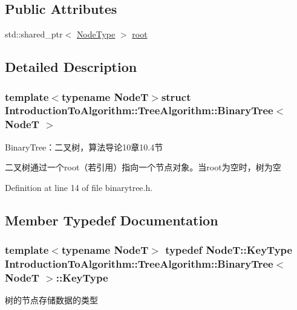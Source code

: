 \subsection*{Public Attributes}
\begin{DoxyCompactItemize}
\item 
std\+::shared\+\_\+ptr$<$ \hyperlink{struct_introduction_to_algorithm_1_1_tree_algorithm_1_1_binary_tree_a9a441f3f41c5b69758204ba60fe02010}{Node\+Type} $>$ \hyperlink{struct_introduction_to_algorithm_1_1_tree_algorithm_1_1_binary_tree_aa0d43af70ef50ff59740dced2e832074}{root}
\end{DoxyCompactItemize}


\subsection{Detailed Description}
\subsubsection*{template$<$typename Node\+T$>$struct Introduction\+To\+Algorithm\+::\+Tree\+Algorithm\+::\+Binary\+Tree$<$ Node\+T $>$}

Binary\+Tree：二叉树，算法导论10章10.4节 

二叉树通过一个root（若引用）指向一个节点对象。当root为空时，树为空 

Definition at line 14 of file binarytree.\+h.



\subsection{Member Typedef Documentation}
\hypertarget{struct_introduction_to_algorithm_1_1_tree_algorithm_1_1_binary_tree_af231d881ec1d08492b2b5b5638e5e373}{}
\subsubsection[{Key\+Type}]{\setlength{\rightskip}{0pt plus 5cm}template$<$typename Node\+T$>$ typedef Node\+T\+::\+Key\+Type {\bf Introduction\+To\+Algorithm\+::\+Tree\+Algorithm\+::\+Binary\+Tree}$<$ Node\+T $>$\+::{\bf Key\+Type}}\label{struct_introduction_to_algorithm_1_1_tree_algorithm_1_1_binary_tree_af231d881ec1d08492b2b5b5638e5e373}
树的节点存储数据的类型 

